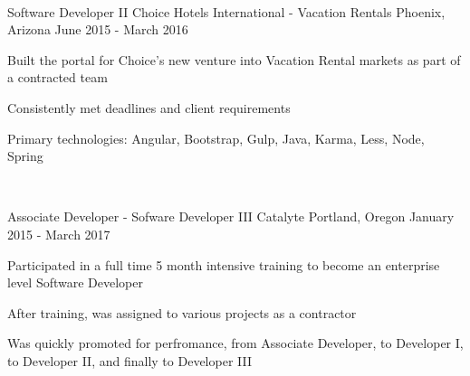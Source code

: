 \begin{cventries}
  ~


  \cventry
    {Software Developer II}
    {Choice Hotels International - Vacation Rentals}
    {Phoenix, Arizona}
    {June 2015 - March 2016}
    {
      \begin{cvitems}
        \item {Built the portal for Choice's new venture into Vacation Rental markets as part of a contracted team}
        \item {Consistently met deadlines and client requirements}
        \item {Primary technologies: Angular, Bootstrap, Gulp, Java, Karma, Less, Node, Spring}
      \end{cvitems}
    }

  ~


  \cventry
    {Associate Developer - Sofware Developer III}
    {Catalyte}
    {Portland, Oregon}
    {January 2015 - March 2017}
    {
      \begin{cvitems}
        \item {Participated in a full time 5 month intensive training to become an enterprise level Software Developer}
        \item {After training, was assigned to various projects as a contractor}
        \item {Was quickly promoted for perfromance, from Associate Developer, to Developer I, to Developer II, and finally to Developer III}
      \end{cvitems}
    }


\end{cventries}
